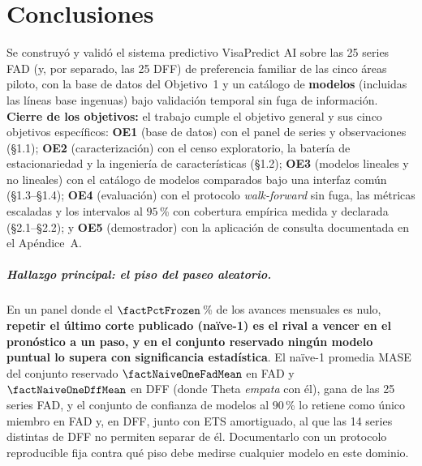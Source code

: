 \documentclass[12pt,letterpaper]{report}
\begin{document}
\chapter{Conclusiones}

Se construyó y validó el sistema predictivo VisaPredict AI sobre las 25 series FAD (y, por
separado, las 25 DFF) de preferencia familiar de las cinco áreas piloto, con la base de datos del
Objetivo~1 y un catálogo de \textbf{\factNModels{} modelos} (incluidas las líneas base ingenuas)
bajo validación temporal sin fuga de información.
\textbf{Cierre de los objetivos:} el trabajo cumple el objetivo general y sus cinco objetivos
específicos: \textbf{OE1} (base de datos) con el panel de \factNSeriesStructural{}
series y \factNObsFmt{} observaciones (§1.1); \textbf{OE2} (caracterización) con el censo
exploratorio, la batería de estacionariedad y la ingeniería de características (§1.2);
\textbf{OE3} (modelos lineales y no lineales) con el catálogo de \factNModels{} modelos
comparados bajo una interfaz común (§1.3--§1.4); \textbf{OE4} (evaluación) con el protocolo
\textit{walk-forward} sin fuga, las métricas escaladas y los intervalos al $95$\,\% con
cobertura empírica medida y declarada (§2.1--§2.2); y \textbf{OE5} (demostrador) con la
aplicación de consulta documentada en el Apéndice~A.

\paragraph{Hallazgo principal: el piso del paseo aleatorio.} En un panel donde el
$\factPctFrozen$\,\% de los avances mensuales es nulo, \textbf{repetir el último corte publicado
(naïve-1) es el rival a vencer en el pronóstico a un paso, y en el conjunto reservado ningún
modelo puntual lo supera con significancia estadística}. El naïve-1 promedia MASE del conjunto reservado
$\factNaiveOneFadMean$ en FAD y $\factNaiveOneDffMean$ en DFF (donde Theta \textit{empata} con
él), gana \factNaiveOneFadHoldoutWins{} de las 25 series FAD, y el conjunto de confianza de
modelos al $90$\,\% lo retiene como único miembro en FAD y, en DFF, junto con ETS amortiguado, al
que las 14 series distintas de DFF no permiten separar de él. Documentarlo con un protocolo
reproducible fija contra qué piso debe medirse cualquier modelo en este dominio.
\end{document}

